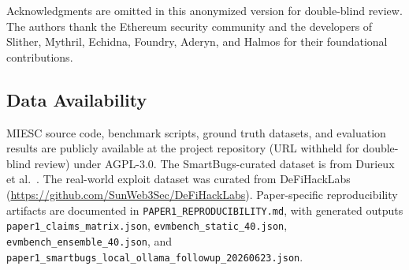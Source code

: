 \documentclass[conference]{IEEEtran}
\begin{document}
Acknowledgments are omitted in this anonymized version for double-blind review. The authors thank the Ethereum security community and the developers of Slither, Mythril, Echidna, Foundry, Aderyn, and Halmos for their foundational contributions.

\subsection*{Data Availability}

MIESC source code, benchmark scripts, ground truth datasets, and evaluation results are publicly available at the project repository (URL withheld for double-blind review) under AGPL-3.0. The SmartBugs-curated dataset is from Durieux et al.~\cite{durieux2020empirical}. The real-world exploit dataset was curated from DeFiHackLabs (\url{https://github.com/SunWeb3Sec/DeFiHackLabs}). Paper-specific reproducibility artifacts are documented in \texttt{PAPER1\_REPRODUCIBILITY.md}, with generated outputs \texttt{paper1\_claims\_matrix.json}, \texttt{evmbench\_static\_40.json}, \texttt{evmbench\_ensemble\_40.json}, and \texttt{paper1\_smartbugs\_local\_ollama\_followup\_20260623.json}.



\end{document}
